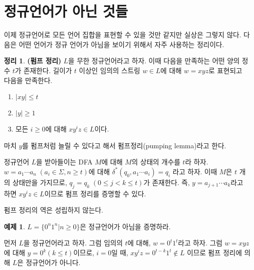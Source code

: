 \documentclass[b5paper]{book}
\theoremstyle{definition}
\newtheorem{thm}{정리}[chapter]
\newtheorem{ex}{예제}[chapter]
\newenvironment{pf*}{\pushQED{\qed}\pf}{\popQED\endpf}
\begin{document}
\section{정규언어가 아닌 것들}
이제 정규언어로 모든 언어 집합을 표현할 수 있을 것만 같지만 실상은 그렇지 않다.
다음은 어떤 언어가 정규 언어가 아님을 보이기 위해서 자주 사용하는 정리이다.
\begin{thm}
    \textbf{(펌프 정리)}
    $L$을 무한 정규언어라고 하자. 이때 다음을 만족하는 어떤 양의 정수 $t$가 존재한다.
길이가 $t$ 이상인 임의의 스트링 $w \in L$에 대해 $w = xyz$로 표현되고 다음을 만족한다.
\begin{enumerate}
    \item $\vert xy \vert \le t$
    \item $\vert y \vert \ge 1$
    \item 모든 $i \ge 0$에 대해 $xy^{i}z \in L$이다.
\end{enumerate}
\end{thm}
마치 $y$를 펌프처럼 늘릴 수 있다고 해서 펌프정리(pumping lemma)라고 한다. 
\begin{pf*}
    정규언어 $L$을 받아들이는 DFA $M$에 대해 $M$의 상태의 개수를 $t$라 하자.
$w = a_1 \cdots a_n \; (a_i \in \Sigma, n \ge t)$에 대해 $\delta^*(q_0, a_1 \cdots a_i) = q_i$
라고 하자. 이때 $M$은 $t$ 개의 상태만을 가지므로, $q_j = q_k \; (0 \le j < k \le t) $가
존재한다. 즉, $y = a_{j+1} \cdots a_k$라고 하면 $xy^iz \in L$이므로 펌프 정리를 증명할 수 있다.  
\begin{figure}[ht]
    \centering
    \caption{} 
    \label{pump}
\end{figure}
\end{pf*}
펌프 정리의 역은 성립하지 않는다. 
\begin{ex} \label{0n1n}
$L = \{0^n 1^n \vert n \ge 0\}$은 정규언어가 아님을 증명하라.
\end{ex}
먼저 $L$을 정규언어라고 하자. 그럼 임의의 $t$에 대해, $w = 0^t 1^t$라고 하자. 그럼
$w=xyz$에 대해 $y = 0^k (k \le t)$이므로, $i=0$일 때, $xy^iz= 0^{t-k} 1^t \notin L$
이므로 펌프 정리에 의해 $L$은 정규언어가 아니다. 
\end{document}
